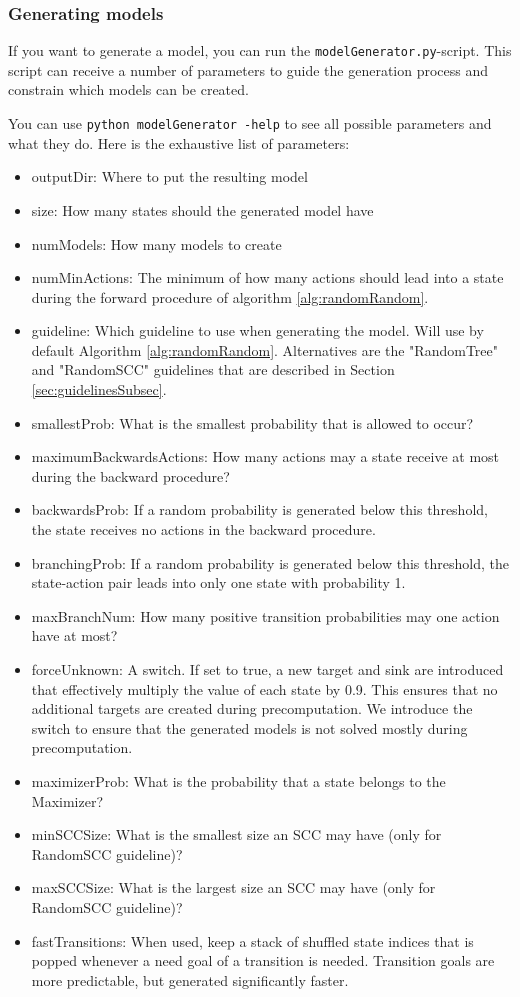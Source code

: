 \subsubsection*{Generating models}
If you want to generate a model, you can run the \texttt{modelGenerator.py}-script.
This script can receive a number of parameters to guide the generation process and constrain which models can be created.

You can use \texttt{python modelGenerator -help} to see all possible parameters and what they do.
Here is the exhaustive list of parameters:
\begin{itemize} \label{list:params}
    \item outputDir: Where to put the resulting model
    \item size: How many states should the generated model have
    \item numModels: How many models to create
    \item numMinActions: The minimum of how many actions should lead into a state during the forward procedure of algorithm \ref{alg:randomRandom}.
    \item guideline: Which guideline to use when generating the model. Will use by default Algorithm \ref{alg:randomRandom}.
    Alternatives are the "RandomTree" and "RandomSCC" guidelines that are described in Section \ref{sec:guidelinesSubsec}.
    \item smallestProb: What is the smallest probability that is allowed to occur?
    \item maximumBackwardsActions: How many actions may a state receive at most during the backward procedure?
    \item backwardsProb: If a random probability is generated below this threshold, the state receives no actions in the backward procedure.
    \item branchingProb: If a random probability is generated below this threshold, the state-action pair leads into only one state with probability 1.
    \item maxBranchNum: How many positive transition probabilities may one action have at most?
    \item forceUnknown: A switch. If set to true, a new target and sink are introduced that effectively multiply the value of each state by 0.9.
    This ensures that no additional targets are created during precomputation. 
    We introduce the switch to ensure that the generated models is not solved mostly during precomputation.
    \item maximizerProb: What is the probability that a state belongs to the Maximizer?
    \item minSCCSize: What is the smallest size an SCC may have (only for RandomSCC guideline)?
    \item maxSCCSize: What is the largest size an SCC may have (only for RandomSCC guideline)?
    \item fastTransitions: When used, keep a stack of shuffled state indices that is popped whenever a need goal of a transition is needed. 
    Transition goals are more predictable, but generated significantly faster.
\end{itemize}

